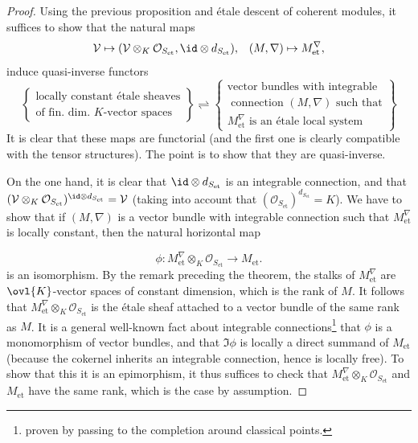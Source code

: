 \begin{proof}
 Using the previous proposition and \'etale descent of coherent
 modules, it suffices to show that the natural maps 
 \begin{equation*}
  \mathcal{V}\mapsto (\mathcal{V}\otimes_K \mathcal{O}_{S_{\mathrm{et}}},
   \id\otimes d_{S_{\mathrm{et}}}),\;\;\;(M,\nabla)\mapsto
   M_{\mathrm{et}}^\nabla,
 \end{equation*}
 induce quasi-inverse functors
 \begin{equation*}
  \left\{
   \begin{matrix}
    \text{locally constant \'etale sheaves}\\
    \text{of fin. dim. $K$-vector spaces}
   \end{matrix}
  \right\}
   \rightleftharpoons
   \left\{
    \begin{matrix}
     \text{vector bundles with integrable}\\
     \text{ connection $(M,\nabla)$ such that}\\
     \text{$M_{\mathrm{et}}^\nabla$ is an \'etale local system}
    \end{matrix}
   \right\}
 \end{equation*}
 It is clear that these maps are functorial (and the first one is clearly
 compatible with the tensor 
 structures). The point is to show that they are quasi-inverse. 
 
 On the one hand, it is clear that $\id\otimes d_{S_{\mathrm{et}}}$ is an
 integrable connection, and that $(\mathcal{V}\otimes_K
 \mathcal{O}_{S_{\mathrm{et}}} )^{\id\otimes
 d_{S_{\mathrm{et}}}}=\mathcal{V}$ (taking into account that
 $(\mathcal{O}_{S_{\mathrm{et}}} )^{d_{S_{\mathrm{et}}}}=K$).
 We have to show that if $(M,\nabla)  $ is a vector bundle with integrable
 connection such that $M_{\mathrm{et}}^\nabla$ is locally constant, then
 the natural horizontal map

 \begin{equation*}
 \phi: M_{\mathrm{et}}^{\nabla}\otimes_K \mathcal{O}_{S_{\mathrm{et}}}\to
 M_{\mathrm{et}}.
 \end{equation*}
 is an isomorphism. By the remark preceding the
 theorem, the stalks of $M_{\mathrm{et}}^\nabla$ are $\ovl{K}$-vector
 spaces of constant dimension, which is the rank of $M$. It follows that 
 $M_{\mathrm{et}}^\nabla\otimes_K \mathcal{O}_{S_{\mathrm{et}}}$ is the
 \'etale sheaf attached to a vector bundle of the same 
 rank as $M$. It is a general well-known fact about integrable
 connections\footnote{proven by passing to the completion around
 classical points.} that $\phi$ is a monomorphism of vector bundles, and
 that $\Im\phi$ is locally a direct summand of
 $M_{\mathrm{et}}$ (because the cokernel inherits an integrable
 connection, hence is locally free). To show that this it is an 
 epimorphism, it thus suffices to check that
 $M_{\mathrm{et}}^\nabla\otimes_K \mathcal{O}_{S_{\mathrm{et}}}$ and
 $M_{\mathrm{et}}$ have the same rank, which is the case by assumption.
\end{proof}

